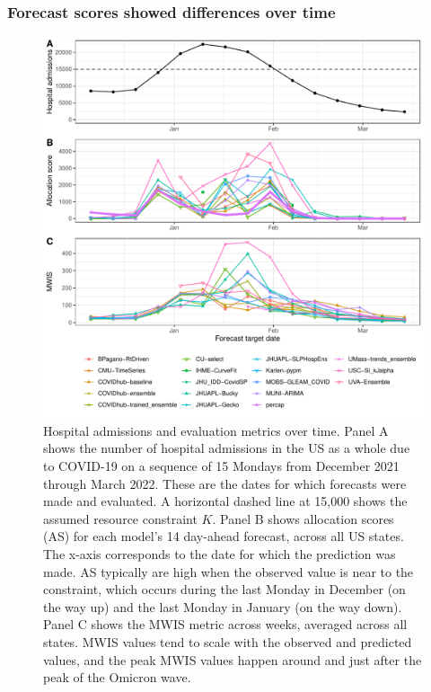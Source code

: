 \documentclass{article}\usepackage[]{graphicx}\usepackage[]{xcolor}
\makeatletter
\def\maxwidth{ %
  \ifdim\Gin@nat@width>\linewidth
    \linewidth
  \else
    \Gin@nat@width
  \fi
}
\newenvironment{knitrout}{}{} %
\makeatother
\begin{document}
\subsubsection{Forecast scores showed differences over time}



\begin{knitrout}
\color{fgcolor}\begin{figure}
\includegraphics[width=\maxwidth]{figure/metrics-over-time-1} \caption[Hospital admissions and evaluation metrics over time]{Hospital admissions and evaluation metrics over time. Panel A shows the number of hospital admissions in the US as a whole due to COVID-19 on a sequence of 15 Mondays from December 2021 through March 2022. These are the dates for which forecasts were made and evaluated. A horizontal dashed line at 15,000 shows the assumed resource constraint $K$. Panel B shows allocation scores (AS) for each model's 14 day-ahead forecast, across all US states. The x-axis corresponds to the date for which the prediction was made. AS typically are high when the observed value is near to the constraint, which occurs during the last Monday in December (on the way up) and the last Monday in January (on the way down). Panel C shows the MWIS metric across weeks, averaged across all states. MWIS values tend to scale with the observed and predicted values, and the peak MWIS values happen around and just after the peak of the Omicron wave.}\label{fig:metrics-over-time}
\end{figure}

\end{knitrout}
\end{document}
